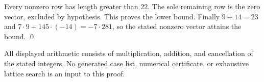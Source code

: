 \documentclass{article}
\begin{document}
Every nonzero row has length greater than \(22\). The sole remaining row is the zero
vector, excluded by hypothesis. This proves the lower bound. Finally \(9 + 14 = 23\) and
\(7 \cdot 9 + 145 \cdot (-14) = -7 \cdot 281\), so the stated nonzero vector attains the
bound. \qed

All displayed arithmetic consists of multiplication, addition, and cancellation of the
stated integers. No generated case list, numerical certificate, or exhaustive lattice
search is an input to this proof.
\end{document}
